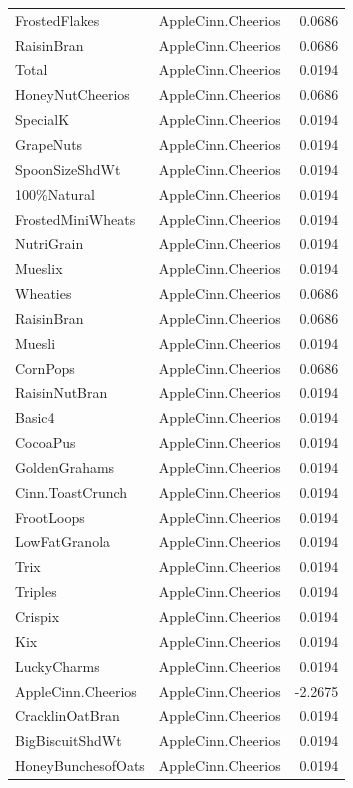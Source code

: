 \begin{longtable}{llr}
FrostedFlakes & AppleCinn.Cheerios & 0.0686 \\
RaisinBran & AppleCinn.Cheerios & 0.0686 \\
Total & AppleCinn.Cheerios & 0.0194 \\
HoneyNutCheerios & AppleCinn.Cheerios & 0.0686 \\
SpecialK & AppleCinn.Cheerios & 0.0194 \\
GrapeNuts & AppleCinn.Cheerios & 0.0194 \\
SpoonSizeShdWt & AppleCinn.Cheerios & 0.0194 \\
100\%Natural & AppleCinn.Cheerios & 0.0194 \\
FrostedMiniWheats & AppleCinn.Cheerios & 0.0194 \\
NutriGrain & AppleCinn.Cheerios & 0.0194 \\
Mueslix & AppleCinn.Cheerios & 0.0194 \\
Wheaties & AppleCinn.Cheerios & 0.0686 \\
RaisinBran & AppleCinn.Cheerios & 0.0686 \\
Muesli & AppleCinn.Cheerios & 0.0194 \\
CornPops & AppleCinn.Cheerios & 0.0686 \\
RaisinNutBran & AppleCinn.Cheerios & 0.0194 \\
Basic4 & AppleCinn.Cheerios & 0.0194 \\
CocoaPus & AppleCinn.Cheerios & 0.0194 \\
GoldenGrahams & AppleCinn.Cheerios & 0.0194 \\
Cinn.ToastCrunch & AppleCinn.Cheerios & 0.0194 \\
FrootLoops & AppleCinn.Cheerios & 0.0194 \\
LowFatGranola & AppleCinn.Cheerios & 0.0194 \\
Trix & AppleCinn.Cheerios & 0.0194 \\
Triples & AppleCinn.Cheerios & 0.0194 \\
Crispix & AppleCinn.Cheerios & 0.0194 \\
Kix & AppleCinn.Cheerios & 0.0194 \\
LuckyCharms & AppleCinn.Cheerios & 0.0194 \\
AppleCinn.Cheerios & AppleCinn.Cheerios & -2.2675 \\
CracklinOatBran & AppleCinn.Cheerios & 0.0194 \\
BigBiscuitShdWt & AppleCinn.Cheerios & 0.0194 \\
HoneyBunchesofOats & AppleCinn.Cheerios & 0.0194 \\

\end{longtable}
